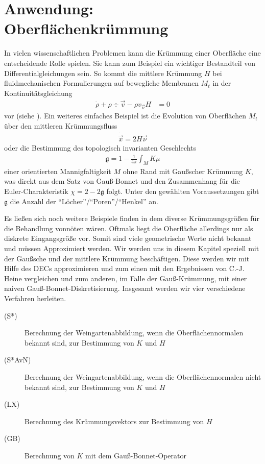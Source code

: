 \chapter{Anwendung: Oberflächenkrümmung}
  
  \begin{ziel}
    In vielen wissenschaftlichen Problemen kann die Krümmung
    einer Oberfläche eine entscheidende Rolle spielen. 
    Sie kann zum Beispiel ein wichtiger Bestandteil von Differentialgleichungen sein.
    So kommt die mittlere Krümmung \( H \) bei fluidmechanischen Formulierungen auf bewegliche Membranen 
    \( M_{t} \) in der
    Kontinuitätsgleichung
    \begin{align}
      \dot{\rho} + \rho\div\vec{v} - \rho v_{\vec{\nu}} H &= 0
    \end{align}
    vor (siehe \cite{desimone}).
    Ein weiteres einfaches Beispiel ist die Evolution von Oberflächen \( M_{t} \) über den mittleren
    Krümmungsfluss
    \begin{align}
      \dot{\vec{x}} = 2 H \vec{\nu} 
    \end{align}
    oder die Bestimmung des topologisch invarianten Geschlechts
    \begin{align}
      \mathfrak{g} = 1 - \frac{1}{4\pi}\int_{M}K\mu
    \end{align}
    einer orientierten Mannigfaltigkeit \( M \) ohne Rand mit Gaußscher Krümmung \( K \),
    was direkt aus dem Satz von Gauß-Bonnet 
    und den Zusammenhang für die Euler-Charakteristik \( \chi = 2-2\mathfrak{g} \) folgt.
    Unter den gewählten Voraussetzungen gibt \( \mathfrak{g} \) die Anzahl der "`Löcher"'/"`Poren"'/"`Henkel"' an.
    
    Es ließen sich noch weitere Beispiele finden in dem diverse Krümmungsgrößen für die Behandlung vonnöten wären.
    Oftmals liegt die Oberfläche allerdings nur als diskrete Eingangsgröße vor. 
    Somit sind viele
    geometrische Werte nicht bekannt und müssen Approximiert werden.
    Wir werden uns in diesem Kapitel speziell mit der Gaußsche und der mittlere Krümmung beschäftigen.
    Diese werden wir mit Hilfe des DECs approximieren und zum einen mit den Ergebnissen von C.-J. Heine 
    \cite{heine} vergleichen und zum anderen, im Falle der Gauß-Krümmung, mit einer naiven 
    Gauß-Bonnet-Diskretisierung.
    Insgesamt werden wir vier verschiedene Verfahren herleiten.
    \begin{description}
      \item[(S*)] Berechnung der Weingartenabbildung, wenn die Oberflächennormalen bekannt sind, zur
              Bestimmung von \( K \) und \( H \)
      \item[(S*AvN)] Berechnung der Weingartenabbildung, wenn die Oberflächennormalen nicht bekannt sind, zur
              Bestimmung von \( K \) und \( H \)
      \item[(LX)] Berechnung des Krümmungsvektors zur Bestimmung von \( H \)
      \item[(GB)] Berechnung von \( K \) mit dem Gauß-Bonnet-Operator
    \end{description}
  \end{ziel}

